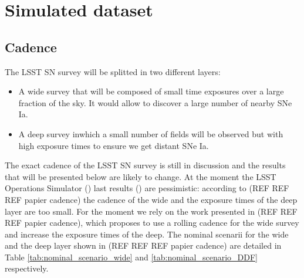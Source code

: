 \documentclass[\docopts]{\docclass}
\begin{document}


\section{Simulated dataset}
\label{sec::simulated_dataset}

\subsection{Cadence}
\label{subsec::cadence}

The LSST SN survey will be splitted in two different layers:
\begin{itemize}
\item A wide survey that will be composed of small time exposures over a large fraction of the sky.
  It would allow to discover a large number of nearby SNe Ia.
\item A deep survey inwhich a small number of fields will be observed but with high exposure times to ensure we get distant SNe Ia.
\end{itemize}
The exact cadence of the LSST SN survey is still in discussion and the results that will be presented below are likely to change.
At the moment the LSST Operations Simulator () last results () are pessimistic: according to (REF REF REF papier cadence) the cadence of the wide and the exposure times of the deep layer are too small.
For the moment we rely on the work presented in (REF REF REF papier cadence), which proposes to use a rolling cadence for the wide survey and increase the exposure times of the deep. The nominal scenarii for the wide and the deep layer shown in (REF REF REF papier cadence) are detailed in Table \ref{tab:nominal_scenario_wide} and \ref{tab:nominal_scenario_DDF} respectively.
\end{document}
